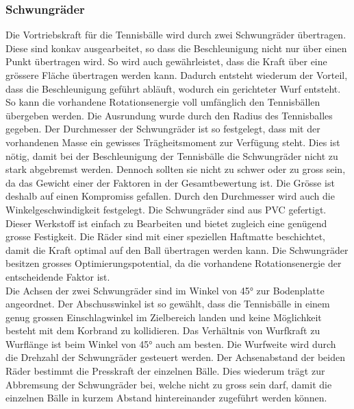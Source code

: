 \subsubsection{Schwungräder}
Die Vortriebskraft für die Tennisbälle wird durch zwei Schwungräder übertragen. Diese sind konkav ausgearbeitet, so dass die Beschleunigung nicht nur über einen Punkt übertragen wird. So wird auch gewährleistet, dass die Kraft über eine grössere Fläche übertragen werden kann. Dadurch entsteht wiederum der Vorteil, dass die Beschleunigung geführt abläuft, wodurch ein gerichteter Wurf entsteht. So kann die vorhandene Rotationsenergie voll umfänglich den Tennisbällen übergeben werden. Die Ausrundung wurde durch den Radius des Tennisballes gegeben. Der Durchmesser der Schwungräder ist so festgelegt, dass mit der vorhandenen Masse ein gewisses Trägheitsmoment zur Verfügung steht. Dies ist nötig, damit bei der Beschleunigung der Tennisbälle die Schwungräder nicht zu stark abgebremst werden. Dennoch sollten sie nicht zu schwer oder zu gross sein, da das Gewicht einer der Faktoren in der Gesamtbewertung ist. Die Grösse ist deshalb auf einen Kompromiss gefallen. Durch den Durchmesser wird auch die Winkelgeschwindigkeit festgelegt. Die Schwungräder sind aus PVC gefertigt. Dieser Werkstoff ist einfach zu Bearbeiten und bietet zugleich eine genügend grosse Festigkeit. Die Räder sind mit einer speziellen Haftmatte beschichtet, damit die Kraft optimal auf den Ball übertragen werden kann. Die Schwungräder besitzen grosses Optimierungspotential, da die vorhandene Rotationsenergie der entscheidende Faktor ist.\\
Die Achsen der zwei Schwungräder sind im Winkel von 45° zur Bodenplatte angeordnet. Der Abschusswinkel ist so gewählt, dass die Tennisbälle in einem genug grossen Einschlagwinkel im Zielbereich landen und keine Möglichkeit besteht mit dem Korbrand zu kollidieren. Das Verhältnis von Wurfkraft zu Wurflänge ist beim Winkel von 45° auch am besten. Die Wurfweite wird durch die Drehzahl der Schwungräder gesteuert werden. Der Achsenabstand der beiden Räder bestimmt die Presskraft der einzelnen Bälle. Dies wiederum trägt zur Abbremsung der Schwungräder bei, welche nicht zu gross sein darf, damit die einzelnen Bälle in kurzem Abstand hintereinander zugeführt werden können. 

